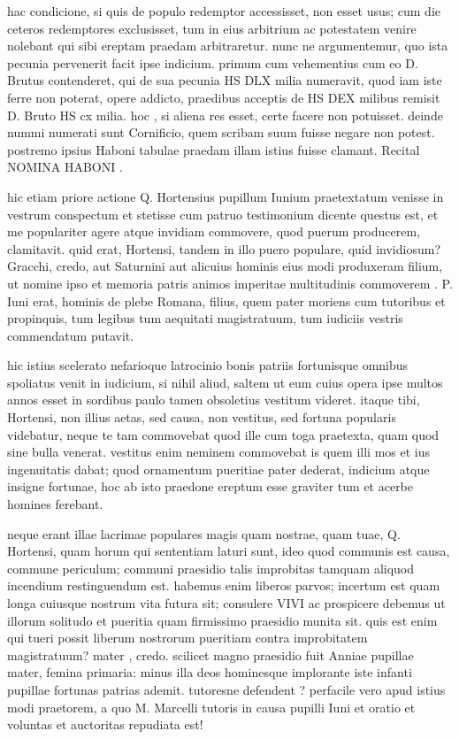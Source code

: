  hac condicione, si quis de populo redemptor accessisset, non esset usus; cum die ceteros redemptores exclusisset, tum in eius arbitrium ac potestatem venire nolebant qui sibi ereptam praedam arbitraretur. nunc ne argumentemur, quo ista pecunia pervenerit facit ipse indicium. primum cum vehementius cum eo D. Brutus contenderet, qui de sua pecunia HS DLX milia numeravit, quod iam iste ferre non poterat, opere addicto, praedibus acceptis de HS DEX milibus remisit D. Bruto HS cx milia. hoc , si aliena res esset, certe facere non potuisset. deinde nummi numerati sunt Cornificio, quem scribam suum fuisse negare non potest. postremo ipsius Haboni tabulae praedam illam istius fuisse clamant. Recital NOMINA HABONI .

 hic etiam priore actione Q. Hortensius pupillum Iunium praetextatum venisse in vestrum conspectum et stetisse cum patruo testimonium dicente questus est, et me populariter agere atque invidiam commovere, quod puerum producerem, clamitavit. quid erat, Hortensi, tandem in illo puero populare, quid invidiosum? Gracchi, credo, aut Saturnini aut alicuius hominis eius modi produxeram filium, ut nomine ipso et memoria patris animos imperitae multitudinis commoverem . P. Iuni erat, hominis de plebe Romana, filius, quem pater moriens cum tutoribus et propinquis, tum legibus tum aequitati magistratuum, tum iudiciis vestris commendatum putavit.

 hic istius scelerato nefarioque latrocinio bonis patriis fortunisque omnibus spoliatus venit in iudicium, si nihil aliud, saltem ut eum cuius opera ipse multos annos esset in sordibus paulo tamen obsoletius vestitum videret. itaque tibi, Hortensi, non illius aetas, sed causa, non vestitus, sed fortuna popularis videbatur, neque te tam commovebat quod ille cum toga praetexta, quam quod sine bulla venerat. vestitus enim neminem commovebat is quem illi mos et ius ingenuitatis dabat; quod ornamentum pueritiae pater dederat, indicium atque insigne fortunae, hoc ab isto praedone ereptum esse graviter tum et acerbe homines ferebant.

 neque erant illae lacrimae populares magis quam nostrae, quam tuae, Q. Hortensi, quam horum qui sententiam laturi sunt, ideo quod communis est causa, commune periculum; communi praesidio talis improbitas tamquam aliquod incendium restinguendum est. habemus enim liberos parvos; incertum est quam longa cuiusque nostrum vita futura sit; consulere VIVI ac prospicere debemus ut illorum solitudo et pueritia quam firmissimo praesidio munita sit. quis est enim qui tueri possit liberum nostrorum pueritiam contra improbitatem magistratuum? mater , credo. scilicet magno praesidio fuit Anniae pupillae mater, femina primaria: minus illa deos hominesque implorante iste infanti pupillae fortunas patrias ademit. tutoresne defendent ? perfacile vero apud istius modi praetorem, a quo M. Marcelli tutoris in causa pupilli Iuni et oratio et voluntas et auctoritas repudiata est!

